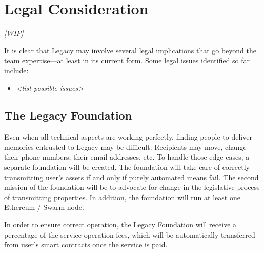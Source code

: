 \chapter{Legal Consideration} %
\label{cha:legal_consideration}

\textit{[WIP]}

It is clear that Legacy may involve several legal implications that go beyond the team expertise---at least in its current form. Some legal issues identified so far include:

\begin{itemize}
	\item \textit{<list possible issues>}
\end{itemize}


\section{The Legacy Foundation} %
\label{sec:the_legacy_foundation}

Even when all technical aspects are working perfectly, finding people to deliver memories entrusted to Legacy may be difficult. Recipients may move, change their phone numbers, their email addresses, etc. To handle those edge cases, a separate foundation will be created. The foundation will take care of correctly transmitting user’s assets if and only if purely automated means fail. 
The second mission of the foundation will be to advocate for change in the legislative process of transmitting properties.
In addition, the foundation will run at least one Ethereum / Swarm node.

In order to ensure correct operation, the Legacy Foundation will receive a percentage of the service operation fees, which will be automatically transferred from user’s smart contracts once the service is paid.


